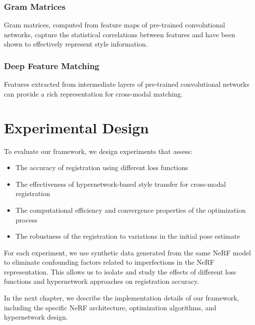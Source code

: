 \subsubsection{Gram Matrices}
Gram matrices, computed from feature maps of pre-trained convolutional networks, capture the statistical correlations between features and have been shown to effectively represent style information.

\subsubsection{Deep Feature Matching}
Features extracted from intermediate layers of pre-trained convolutional networks can provide a rich representation for cross-modal matching.

\section{Experimental Design}
To evaluate our framework, we design experiments that assess:

\begin{itemize}
    \item The accuracy of registration using different loss functions
    \item The effectiveness of hypernetwork-based style transfer for cross-modal registration
    \item The computational efficiency and convergence properties of the optimization process
    \item The robustness of the registration to variations in the initial pose estimate
\end{itemize}

For each experiment, we use synthetic data generated from the same NeRF model to eliminate confounding factors related to imperfections in the NeRF representation. This allows us to isolate and study the effects of different loss functions and hypernetwork approaches on registration accuracy.

In the next chapter, we describe the implementation details of our framework, including the specific NeRF architecture, optimization algorithms, and hypernetwork design. 